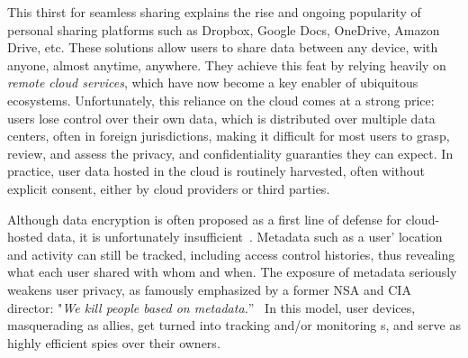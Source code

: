 This thirst for seamless sharing explains the rise and ongoing popularity
of personal sharing platforms such as Dropbox, Google Docs,
OneDrive, Amazon Drive, etc. These solutions allow users to share data between any device, with anyone, almost
anytime, anywhere. They achieve this feat by relying heavily on
\emph{remote cloud services}, which have now become a key enabler of ubiquitous ecosystems. 
Unfortunately, this reliance on the cloud comes at a strong price: 
users lose control over their own data, which is distributed over
multiple data centers, often in foreign jurisdictions, making it difficult for most users to grasp, review, and assess the privacy, and
confidentiality guaranties they can expect. In practice, user data hosted in the cloud is routinely harvested, often without explicit
consent, either by cloud providers or third parties.

Although data encryption is often proposed as a first line of defense for cloud-hosted data, it is unfortunately  insufficient~\cite{granick_2017, HooffLZZ15, HarnikPS10}. Metadata such as a user'
location and activity can still be tracked, including access
control histories, thus revealing what each user shared with whom and when. 
The exposure of metadata seriously weakens user privacy, as famously emphasized by a former NSA and CIA director: "\emph{We kill people based on metadata.}''~\cite{NaughtonTheGuardian2016} 
In this model, user devices, masquerading as allies, get turned into tracking and/or monitoring \squad{}s, and serve as highly efficient spies over their owners. 

